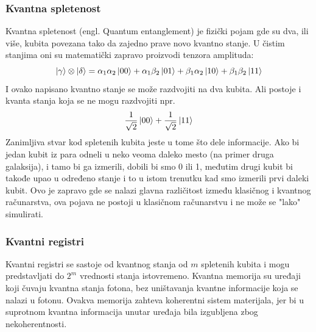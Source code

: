 \documentclass[12pt, letterpaper, oneside]{article}
\begin{document}
\subsubsection*{Kvantna spletenost}
Kvantna spletenost (engl. Quantum entanglement) je fizički pojam gde su dva, ili više, kubita povezana tako da zajedno prave novo kvantno stanje.
U čistim stanjima oni su matematički zapravo proizvodi tenzora amplituda:
\[
    \ket{\gamma} \otimes \ket{\delta} = \alpha_1\alpha_2\ket{00} + \alpha_1\beta_2\ket{01} + \beta_1\alpha_2\ket{10} + \beta_1\beta_2\ket{11}
\]
I ovako napisano kvantno stanje se može razdvojiti na dva kubita. Ali postoje i kvanta stanja koja se ne mogu razdvojiti npr.
\[
 \frac{1}{\sqrt{2}}\ket{00} + \frac{1}{\sqrt{2}}\ket{11}
\]
Zanimljiva stvar kod spletenih kubita jeste u tome što dele informacije. Ako bi jedan kubit iz para odneli u neko veoma daleko mesto (na primer druga galaksija),
i tamo bi ga izmerili, dobili bi smo 0 ili 1, međutim drugi kubit bi takođe upao u određeno stanje i to u istom trenutku kad smo izmerili prvi daleki kubit.
Ovo je zapravo gde se nalazi glavna različitost između klasičnog i kvantnog računarstva, ova pojava ne postoji u klasičnom računarstvu i ne može se "lako" simulirati.
\subsubsection*{Kvantni registri}
Kvantni registri se sastoje od kvantnog stanja od $m$ spletenih kubita i mogu predstavljati do $2^m$ vrednosti stanja istovremeno.
Kvantna memorija su uređaji koji čuvaju kvantna stanja fotona, bez uništavanja kvantne informacije koja se nalazi u fotonu.
Ovakva memorija zahteva koherentni sistem materijala, jer bi u suprotnom kvantna informacija unutar uređaja bila izgubljena zbog nekoherentnosti.
\end{document}
